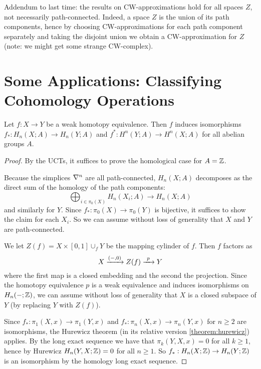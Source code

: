 

Addendum to last time: the results on CW-approximations hold for all spaces $Z$, not necessarily path-connected. Indeed, a space $Z$ is the union of its path components, hence by choosing CW-approximations for each path component separately and taking the disjoint union we obtain a CW-approximation for $Z$ (note: we might get some strange CW-complex).

\section{Some Applications: Classifying Cohomology Operations}

\begin{theorem}
Let $f:X\to Y$ be a weak homotopy equivalence. Then $f$ induces isomorphisms $f_*:H_n(X;A)\to H_n(Y;A)$ and $f^*:H^n(Y;A)\to H^n(X;A)$ for all abelian groups $A$.
\end{theorem}

\begin{proof}
By the UCTs, it suffices to prove the homological case for $A={\mathbb Z}$.

Because the simplices $\nabla^n$ are all path-connected, $H_n(X;A)$ decomposes as the direct sum of the homology of the path components:
\[\bigoplus_{i\in\pi_0(X)}H_n(X_i;A)\to H_n(X;A)\]
and similarly for $Y$. Since $f_*:\pi_0(X)\to\pi_0(Y)$ is bijective, it suffices to show the claim for each $X_i$. So we can assume without loss of generality that $X$ and $Y$ are path-connected.

We let $Z(f)=X\times[0,1]\cup_f Y$ be the mapping cylinder of $f$. Then $f$ factors as
\[X\xto{(-,0)}Z(f)\xto{\ p\ }Y\]
where the first map is a closed embedding and the second the projection. Since the homotopy equivalence $p$ is a weak equivalence and induces isomorphisms on $H_n(-;{\mathbb Z})$, we can assume without loss of generality that $X$ is a closed subspace of $Y$ (by replacing $Y$ with $Z(f)$).

Since $f_*:\pi_1(X,x)\to\pi_1(Y,x)$ and $f_*:\pi_n(X,x)\to\pi_n(Y,x)$ for $n\ge2$ are isomorphisms, the Hurewicz theorem (in its relative version \ref{theorem:hurewicz}) applies. By the long exact sequence we have that $\pi_k(Y,X,x)=0$ for all $k\ge1$, hence by Hurewicz $H_n(Y,X;{\mathbb Z})=0$ for all $n\ge1$. So $f_*:H_n(X;{\mathbb Z})\to H_n(Y;{\mathbb Z})$ is an isomorphism by the homology long exact sequence.
\end{proof}

